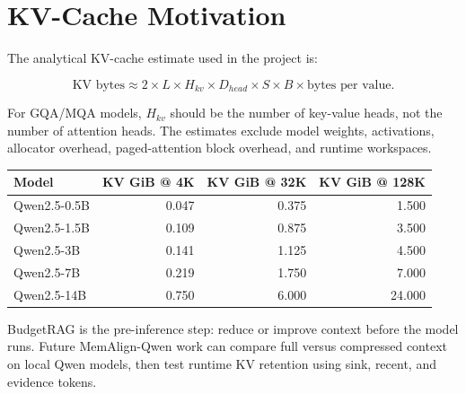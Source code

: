 \section{KV-Cache Motivation}

The analytical KV-cache estimate used in the project is:

\[
\text{KV bytes} \approx 2 \times L \times H_{kv} \times D_{head} \times S \times B \times \text{bytes per value}.
\]

For GQA/MQA models, $H_{kv}$ should be the number of key-value heads, not the number of attention heads. The estimates exclude model weights, activations, allocator overhead, paged-attention block overhead, and runtime workspaces.

\begin{center}
\begin{tabular}{l r r r}
\toprule
Model & KV GiB @ 4K & KV GiB @ 32K & KV GiB @ 128K \\
\midrule
Qwen2.5-0.5B & 0.047 & 0.375 & 1.500 \\
Qwen2.5-1.5B & 0.109 & 0.875 & 3.500 \\
Qwen2.5-3B & 0.141 & 1.125 & 4.500 \\
Qwen2.5-7B & 0.219 & 1.750 & 7.000 \\
Qwen2.5-14B & 0.750 & 6.000 & 24.000 \\
\bottomrule
\end{tabular}
\end{center}

BudgetRAG is the pre-inference step: reduce or improve context before the model runs. Future MemAlign-Qwen work can compare full versus compressed context on local Qwen models, then test runtime KV retention using sink, recent, and evidence tokens.
